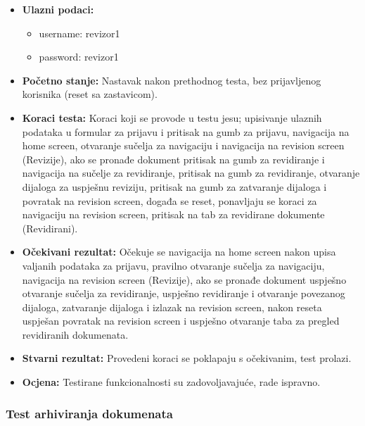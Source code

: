 			\begin{itemize}
				
				\item{\textbf{Ulazni podaci:}}
				\begin{itemize}
					\item{username: revizor1}
					\item{password: revizor1}
				\end{itemize}
				
				\item{\textbf{Početno stanje:} Nastavak nakon prethodnog testa, bez prijavljenog korisnika (reset sa zastavicom).}
				
				\item{\textbf{Koraci testa:} Koraci koji se provode u testu jesu; upisivanje ulaznih podataka u formular za prijavu i pritisak na gumb za prijavu, navigacija na home screen, otvaranje sučelja za navigaciju i navigacija na revision screen (Revizije), ako se pronađe dokument pritisak na gumb za revidiranje i navigacija na sučelje za revidiranje, pritisak na gumb za revidiranje, otvaranje dijaloga za uspješnu reviziju, pritisak na gumb za zatvaranje dijaloga i povratak na revision screen, događa se reset, ponavljaju se koraci za navigaciju na revision screen, pritisak na tab za revidirane dokumente (Revidirani).}
				
				\item{\textbf{Očekivani rezultat:} Očekuje se navigacija na home screen nakon upisa valjanih podataka za prijavu, pravilno otvaranje sučelja za navigaciju, navigacija na revision screen (Revizije), ako se pronađe dokument uspješno otvaranje sučelja za revidiranje, uspješno revidiranje i otvaranje povezanog dijaloga, zatvaranje dijaloga i izlazak na revision screen, nakon reseta uspješan povratak na revision screen i uspješno otvaranje taba za pregled revidiranih dokumenata.}
				
				\item{\textbf{Stvarni rezultat:} Provedeni koraci se poklapaju s očekivanim, test prolazi.}
				
				\item{\textbf{Ocjena:} Testirane funkcionalnosti su zadovoljavajuće, rade ispravno.}
				
			\end{itemize}
			
			\subsubsection{Test arhiviranja dokumenata}
			
